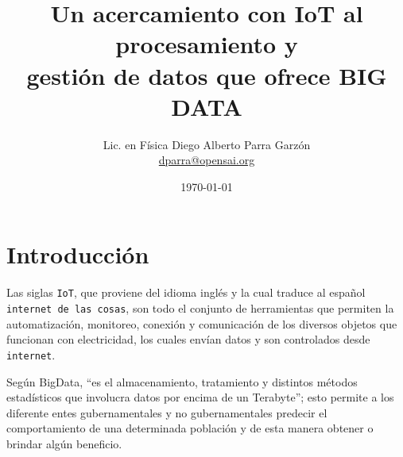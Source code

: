 \documentclass[jou]{apa6} %
\title{Un acercamiento con IoT al procesamiento y \\gestión de datos que ofrece BIG DATA }
\author{Lic. en Física Diego Alberto Parra Garzón \\ \href{mailto:{dparra@opensai.org}}{dparra@opensai.org}}
\date{\today}
\affiliation{OPENSAI, FISINFOR}
\begin{document}
\renewcommand{\tablename}{Tabla} %
\renewcommand{\refname}{Referencias} %
\def\st@rtbibsection{\mspart{RReferencias}}%
\renewcommand{\rheadname}{Encabezado de página}%
\renewcommand{\acksname}{Nota de Autor}%
\renewcommand{\keywordname}{Palabras clave}%
\renewcommand{\listtablename}{Índice de tablas}%
\renewcommand{\BOthers}[1]{et al.\hbox{}}
\renewcommand{\appendixname}{Ap} %
\renewcommand{\appendixname}{Anexo}
\renewcommand{\appendixname}{Anexos}
\renewcommand{\appendixtocname}{Anexos}
\renewcommand{\appendixpagename}{Anexos}
\maketitle


\tableofcontents
\listoffigures

\section{Introducción}
Las siglas \cite{gubbi2013internet} \texttt{IoT}, que proviene del idioma inglés y la cual traduce al español \texttt{internet de las cosas}, son todo el conjunto de herramientas que permiten la automatización, monitoreo, conexión y comunicación de los diversos objetos  que funcionan con electricidad, los cuales envían datos y son controlados desde \texttt{internet}.

\bigskip

Según \cite{john2014big} BigData, ``es el almacenamiento, tratamiento y distintos métodos estadísticos que involucra datos por encima de un  Terabyte''; esto permite a los  diferente entes gubernamentales y no  gubernamentales predecir el comportamiento de una determinada población y de esta manera obtener o brindar algún beneficio.

\bigskip
\end{document}
